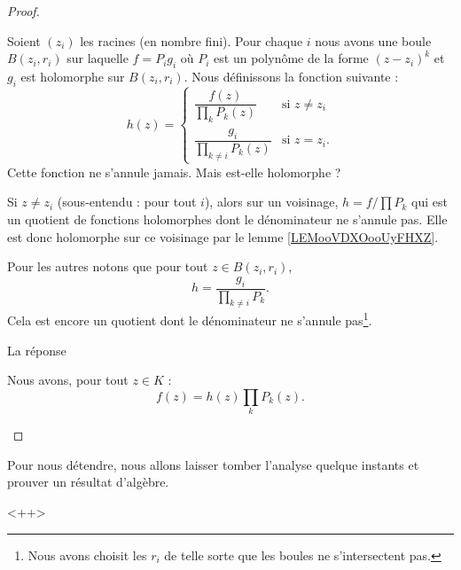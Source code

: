 \begin{proof}
\begin{subproof}
            Soient \( (z_i)\) les racines (en nombre fini). Pour chaque \( i\) nous avons une boule \( B(z_i,r_i)\) sur laquelle \( f=P_ig_i\) où \( P_i\) est un polynôme de la forme \( (z-z_i)^k\) et \( g_i\) est holomorphe sur \( B(z_i,r_i)\). Nous définissons la fonction suivante :
            \begin{equation}
                h(z)=\begin{cases}
                    \dfrac{ f(z) }{ \prod_kP_k(z) }    &   \text{si } z\neq z_i\\
                    \dfrac{ g_i }{ \prod_{k\neq i}P_k(z) }    &    \text{si } z=z_i.
                \end{cases}
            \end{equation}
            Cette fonction ne s'annule jamais. Mais est-elle holomorphe ? 
            
            Si \( z\neq z_i\) (sous-entendu : pour tout \( i\)), alors sur un voisinage, \( h=f/\prod P_k\) qui est un quotient de fonctions holomorphes dont le dénominateur ne s'annule pas. Elle est donc holomorphe sur ce voisinage par le lemme \ref{LEMooVDXOooUyFHXZ}.

            Pour les autres notons que pour tout \( z\in B(z_i,r_i)\),
            \begin{equation}
                h=\frac{ g_i }{\prod_{k\neq i}P_k}.
            \end{equation}
            Cela est encore un quotient dont le dénominateur ne s'annule pas\footnote{Nous avons choisit les \( r_i\) de telle sorte que les boules ne s'intersectent pas.}.

        \item[La réponse]

            Nous avons, pour tout \( z\in K\) : 
            \begin{equation}
                f(z)=h(z)\prod_{k}P_k(z).
            \end{equation}

    \end{subproof}
\end{proof}


Pour nous détendre, nous allons laisser tomber l'analyse quelque instants et prouver un résultat d'algèbre.
\begin{proposition}
    
\end{proposition}
<++>


